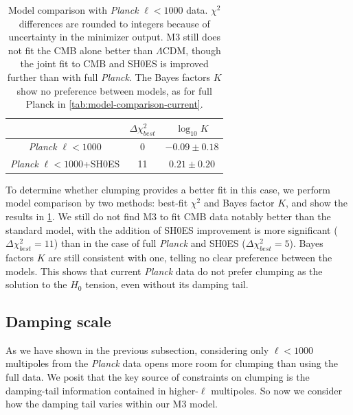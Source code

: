 \begin{table}[ht!]
\centering
\begin{tabular}{|c|c|c|}
\hline
 & $\Delta \chi^2_{best}$ & $\log_{10} K$ \\
\hline
{\it Planck} $\ell<1000$ & 0 & $-0.09\pm 0.18$ \\
\hline
{\it Planck} $\ell<1000$+SH0ES & 11 & $0.21\pm 0.20$ \\
\hline
\end{tabular}
\caption[Comparison between the clumping and the standard model with {\it Planck} $\ell<1000$ data]{Model comparison with {\it Planck} $\ell<1000$ data.
$\chi^2$ differences are rounded to integers because of uncertainty in the minimizer output.
M3 still does not fit the CMB alone better than $\Lambda$CDM, though the joint fit to CMB and SH0ES is improved further than with full {\it Planck}.
The Bayes factors $K$ show no preference between models, as for full Planck in \cref{tab:model-comparison-current}.}
\label{tab:model-comparison-lowl}
\end{table}

To determine whether clumping provides a better fit in this case, we perform model comparison by two methods: best-fit $\chi^2$ and Bayes factor $K$, and show the results in \cref{tab:model-comparison-lowl}. 
We still do not find M3 to fit CMB data notably better than the standard model, with the addition of SH0ES improvement is more significant ($\Delta\chi^2_{best}=11$) than in the case of full {\it Planck} and SH0ES ($\Delta\chi^2_{best}=5$).
Bayes factors $K$ are still consistent with one, telling no clear preference between the models.
This shows that current {\it Planck} data do not prefer clumping as the solution to the $H_0$ tension, even without its damping tail.

\subsection{Damping scale}
\label{sec:planck-damping-scale}

As we have shown in the previous subsection, considering only $\ell<1000$ multipoles from the {\it Planck} data opens more room for clumping than using the full data.
We posit that the key source of constraints on clumping is the damping-tail information contained in higher-$\ell$ multipoles.
So now we consider how the damping tail varies within our M3 model.

